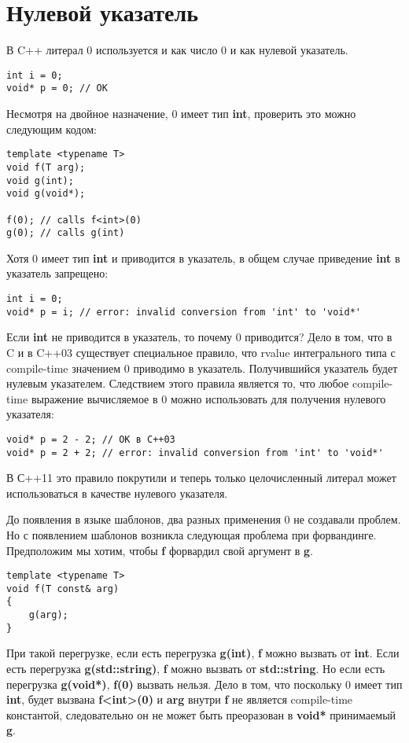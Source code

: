 \section{Нулевой указатель}
В C++ литерал 0 используется и как число 0 и как нулевой указатель.
\begin{verbatim}
int i = 0;
void* p = 0; // OK
\end{verbatim}
Несмотря на двойное назначение, 0 имеет тип {\bf int}, проверить это можно следующим кодом:
\begin{verbatim}
template <typename T>
void f(T arg);
void g(int);
void g(void*);

f(0); // calls f<int>(0)
g(0); // calls g(int)
\end{verbatim}
Хотя 0 имеет тип {\bf int} и приводится в указатель, в общем случае приведение {\bf int} в указатель запрещено:
\begin{verbatim}
int i = 0;
void* p = i; // error: invalid conversion from 'int' to 'void*'
\end{verbatim}
Если {\bf int} не приводится в указатель, то почему 0 приводится? Дело в том, что в C и в C++03 существует специальное правило, что rvalue интегрального типа с compile-time значением 0 приводимо в указатель. Получившийся указатель будет нулевым указателем. Следствием этого правила является то, что любое compile-time выражение вычисляемое в 0 можно использовать для получения нулевого указателя:
\begin{verbatim}
void* p = 2 - 2; // OK в C++03
void* p = 2 + 2; // error: invalid conversion from 'int' to 'void*'
\end{verbatim}
В С++11 это правило покрутили и теперь только целочисленный литерал может использоваться в качестве нулевого указателя.

До появления в языке шаблонов, два разных применения 0 не создавали проблем. Но с появлением шаблонов возникла следующая проблема при форвандинге. Предположим мы хотим, чтобы {\bf f} форвардил свой аргумент в {\bf g}.
\begin{verbatim}
template <typename T>
void f(T const& arg)
{
    g(arg);
}
\end{verbatim}
При такой перегрузке, если есть перегрузка {\bf g(int)}, {\bf f} можно вызвать от {\bf int}. Если есть перегрузка {\bf g(std::string)}, {\bf f} можно вызвать от {\bf std::string}. Но если есть перегрузка {\bf g(void*)}, {\bf f(0)} вызвать нельзя. Дело в том, что поскольку 0 имеет тип {\bf int}, будет вызвана {\bf f<int>(0)} и {\bf arg} внутри {\bf f} не является compile-time константой, следовательно он не может быть преоразован в {\bf void*} принимаемый {\bf g}.

